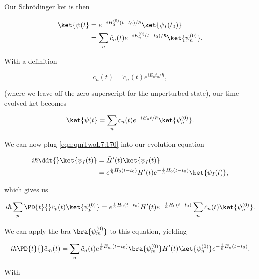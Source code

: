 Our Schr\"{o}dinger ket is then

\begin{equation}\label{eqn:qmTwoL7:190}
\begin{aligned}
\ket{\psi(t}
&=
e^{-i H_0^{(0)}(t- t_0)/\hbar}
\ket{\psi_I(t_0) } \\
&=
\sum_n \tilde{c}_n(t)
e^{-i E_n^{(0)}(t- t_0)/\hbar}
\ket{\psi_n^{(0)} }.
\end{aligned}
\end{equation}

With a definition

\begin{equation}\label{eqn:qmTwoL7:210}
c_n(t) = \tilde{c}_n(t) e^{i E_n t_0/\hbar},
\end{equation}

(where we leave off the zero superscript for the unperturbed state), our time evolved ket becomes

\begin{equation}\label{eqn:qmTwoL7:230}
\ket{\psi(t}
=
\sum_n c_n(t)
e^{-i E_n t/\hbar}
\ket{\psi_n^{(0)} }.
\end{equation}

We can now plug \ref{eqn:qmTwoL7:170} into our evolution equation

\begin{align*}
i\hbar \ddt{} \ket{\psi_I(t)}
&=
\bar{H}'(t) \ket{\psi_I(t)} \\
&=
e^{\frac{i}{\hbar} H_0(t - t_0)} H'(t) e^{-\frac{i}{\hbar} H_0(t - t_0)}
\ket{\psi_I(t)},
\end{align*}

which gives us

\begin{equation}\label{eqn:qmTwoL7:250}
i \hbar \sum_p \PD{t}{}
\tilde{c}_p(t) \ket{\psi_p^{(0)} }
=
e^{\frac{i}{\hbar} H_0(t - t_0)} H'(t) e^{-\frac{i}{\hbar} H_0(t - t_0)}
\sum_n
\tilde{c}_n(t) \ket{\psi_n^{(0)} }.
\end{equation}

We can apply the bra $\bra{\psi_m^{(0)}}$ to this equation, yielding

\begin{equation}\label{eqn:qmTwoL7:270}
i \hbar \PD{t}{}
\tilde{c}_m(t)
=
\sum_n
\tilde{c}_n(t)
e^{\frac{i}{\hbar} E_m(t - t_0)}
\bra{\psi_m^{(0)}} H'(t)
\ket{\psi_n^{(0)} }
e^{-\frac{i}{\hbar} E_n(t - t_0)}.
\end{equation}

With

